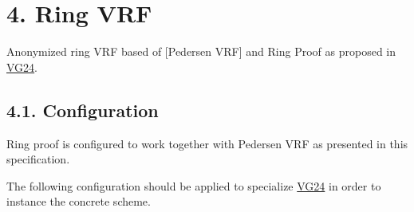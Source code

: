 \documentclass[
]{article}
\begin{document}
\hypertarget{ring-vrf}{%
\section{4. Ring VRF}\label{ring-vrf}}

Anonymized ring VRF based of {[}Pedersen VRF{]} and Ring Proof as
proposed in \href{https://github.com/davxy/ring-proof-spec}{VG24}.

\hypertarget{configuration-2}{%
\subsection{4.1. Configuration}\label{configuration-2}}

Ring proof is configured to work together with Pedersen VRF as presented
in this specification.

The following configuration should be applied to specialize
\href{https://github.com/davxy/ring-proof-spec}{VG24} in order to
instance the concrete scheme.
\end{document}
